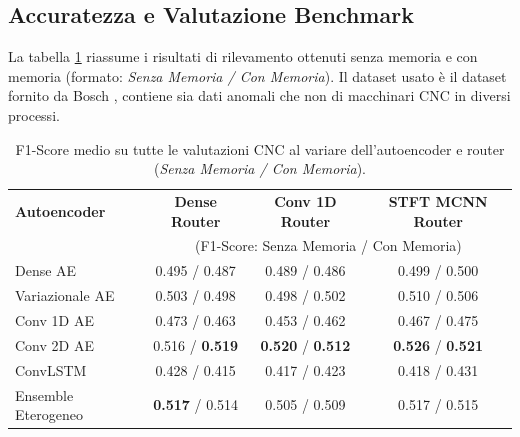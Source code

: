 \subsection{Accuratezza e Valutazione Benchmark}
La tabella \ref{tab:benchmark_f1_summary} riassume i risultati di rilevamento ottenuti senza memoria e con memoria (formato: \emph{Senza Memoria / Con Memoria}).
Il dataset usato è il dataset fornito da Bosch  \cite{bosch_cnc_dataset}, contiene sia dati anomali che non di macchinari CNC in diversi processi.

\begin{table}[H]
	\centering
	\begin{tabular}{lccc}
		\toprule
		\textbf{Autoencoder} & \textbf{Dense Router} & \textbf{Conv 1D Router} & \textbf{STFT MCNN Router} \\
		& \multicolumn{3}{c}{\small (F1-Score: Senza Memoria / Con Memoria)} \\
		\midrule
		Dense AE            & 0.495 / 0.487 & 0.489 / 0.486 & 0.499 / 0.500 \\
		Variazionale AE     & 0.503 / 0.498 & 0.498 / 0.502 & 0.510 / 0.506 \\
		Conv 1D AE          & 0.473 / 0.463 & 0.453 / 0.462 & 0.467 / 0.475 \\
		Conv 2D AE          & 0.516 / \textbf{0.519} & \textbf{0.520} / \textbf{0.512} & \textbf{0.526} / \textbf{0.521} \\
		ConvLSTM            & 0.428 / 0.415 & 0.417 / 0.423 & 0.418 / 0.431 \\
		Ensemble Eterogeneo & \textbf{0.517} / 0.514 & 0.505 / 0.509 & 0.517 / 0.515 \\
		\bottomrule
	\end{tabular}
	\caption{F1-Score medio su tutte le valutazioni CNC al variare dell'autoencoder e router (\emph{Senza Memoria / Con Memoria}).}
	\label{tab:benchmark_f1_summary}
\end{table}

